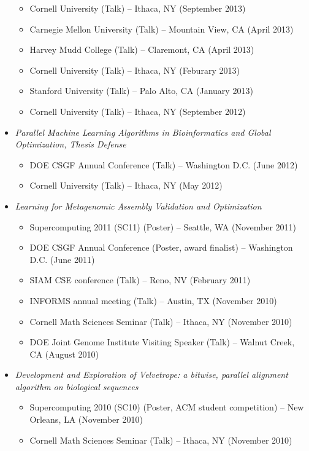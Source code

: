 \documentclass[letterpaper,11pt]{article}
\begin{document}
\begin{itemize}
\begin{itemize}
        \item Cornell University (Talk) -- Ithaca, NY (September 2013)
        \item Carnegie Mellon University (Talk) -- Mountain View, CA (April 2013)
        \item Harvey Mudd College (Talk) -- Claremont, CA (April 2013)
        \item Cornell University (Talk) -- Ithaca, NY (Feburary 2013)
        \item Stanford University (Talk) -- Palo Alto, CA (January 2013)
        \item Cornell University (Talk) -- Ithaca, NY (September 2012)
    \end{itemize}
\item
    {\it Parallel Machine Learning Algorithms in Bioinformatics and Global Optimization, Thesis Defense}
    \begin{itemize}
		\item DOE CSGF Annual Conference (Talk) -- Washington D.C. (June 2012)
        \item Cornell University (Talk) -- Ithaca, NY (May 2012)
    \end{itemize}
\item
	{\it Learning for Metagenomic Assembly Validation and Optimization}
	\begin{itemize}
        \item Supercomputing 2011 (SC11) (Poster) -- Seattle, WA (November 2011)
		\item DOE CSGF Annual Conference (Poster, award finalist) -- Washington D.C. (June 2011)
        \item SIAM CSE conference (Talk) -- Reno, NV (February 2011)
		\item INFORMS annual meeting (Talk) -- Austin, TX (November 2010)
		\item Cornell Math Sciences Seminar (Talk) -- Ithaca, NY (November 2010)
		\item DOE Joint Genome Institute Visiting Speaker (Talk) -- Walnut Creek, CA (August 2010)
	\end{itemize}
\item
	{\it Development and Exploration of Velvetrope: a bitwise, parallel alignment algorithm on biological sequences}
	\begin{itemize}
		\item Supercomputing 2010 (SC10) (Poster, ACM student competition) -- New Orleans, LA (November 2010)
		\item Cornell Math Sciences Seminar (Talk) -- Ithaca, NY (November 2010)

\end{itemize}
\end{itemize}
\end{document}
